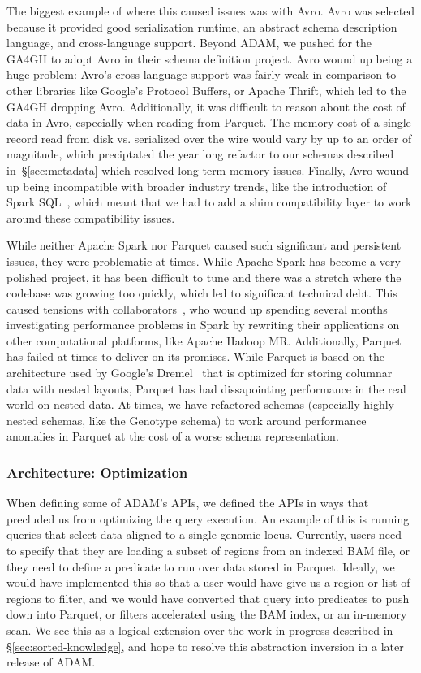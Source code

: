 \documentclass[phd]{ucbthesis}
\begin{document}
The biggest example of where this caused issues was with Avro. Avro was selected
because it provided good serialization runtime, an abstract schema description
language, and cross-language support. Beyond ADAM, we pushed for the GA4GH
to adopt Avro in their schema definition project. Avro wound up being a huge
problem: Avro's cross-language support was fairly weak in comparison to other
libraries like Google's Protocol Buffers, or Apache Thrift, which led to the
GA4GH dropping Avro. Additionally, it was difficult to reason about the cost
of data in Avro, especially when reading from Parquet. The memory cost of a
single record read from disk vs. serialized over the wire would vary by up to an
order of magnitude, which preciptated the year long refactor to our schemas
described in~\S\ref{sec:metadata} which resolved long term memory issues.
Finally, Avro wound up being incompatible with broader industry trends, like
the introduction of Spark SQL~\cite{armbrust15}, which meant that we had to add
a shim compatibility layer to work around these compatibility issues.

While neither Apache Spark nor Parquet caused such significant and persistent
issues, they were problematic at times. While Apache Spark has become a very
polished project, it has been difficult to tune and there was a stretch where
the codebase was growing too quickly, which led to significant technical debt.
This caused tensions with collaborators~\cite{rubinsteyn14}, who wound up
spending several months investigating performance problems in Spark by rewriting
their applications on other computational platforms, like Apache Hadoop MR.
Additionally, Parquet has failed at times to deliver on its promises. While
Parquet is based on the architecture used by Google's Dremel~\cite{melnik10}
that is optimized for storing columnar data with nested layouts, Parquet has
had dissapointing performance in the real world on nested data. At times, we
have refactored schemas (especially highly nested schemas, like the Genotype
schema) to work around performance anomalies in Parquet at the cost of a worse
schema representation.

\subsubsection{Architecture: Optimization}
\label{sec:fail-optimization}

When defining some of ADAM's APIs, we defined the APIs in ways that precluded us
from optimizing the query execution. An example of this is running queries that
select data aligned to a single genomic locus. Currently, users need to specify
that they are loading a subset of regions from an indexed BAM file, or they need
to define a predicate to run over data stored in Parquet. Ideally, we would have
implemented this so that a user would have give us a region or list of regions
to filter, and we would have converted that query into predicates to push down
into Parquet, or filters accelerated using the BAM index, or an in-memory scan.
We see this as a logical extension over the work-in-progress described in
\S\ref{sec:sorted-knowledge}, and hope to resolve this abstraction inversion in
a later release of ADAM.
\end{document}
